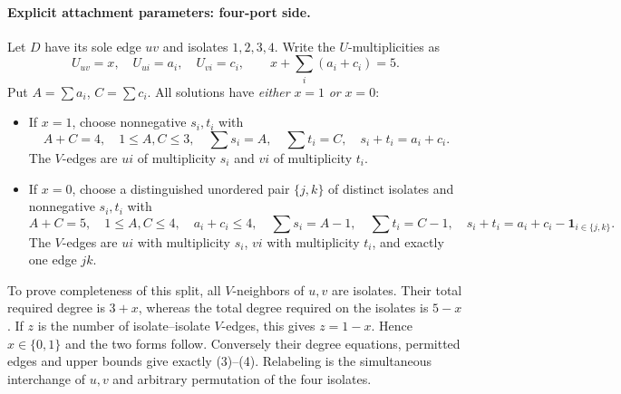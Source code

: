 \documentclass[11pt]{article}
\begin{document}
\paragraph{Explicit attachment parameters: four-port side.}
Let $D$ have its sole edge $uv$ and isolates $1,2,3,4$.
Write the $U$-multiplicities as
\[
 U_{uv}=x,\quad U_{u i}=a_i,\quad U_{v i}=c_i,
 \qquad x+\sum_i(a_i+c_i)=5.                        \tag{10}
\]
Put $A=\sum a_i$, $C=\sum c_i$.
All solutions have \emph{either} $x=1$ \emph{or} $x=0$:
\begin{itemize}
\item If $x=1$, choose nonnegative $s_i,t_i$ with
\[
 A+C=4,\quad1\leq A,C\leq3,\quad
 \sum s_i=A,\quad\sum t_i=C,\quad
 s_i+t_i=a_i+c_i.                                 \tag{11}
\]
The $V$-edges are $u i$ of multiplicity $s_i$ and $v i$ of
multiplicity $t_i$.
\item If $x=0$, choose a distinguished unordered pair $\{j,k\}$
of distinct isolates and nonnegative $s_i,t_i$ with
\[
 A+C=5,\quad1\leq A,C\leq4,\quad a_i+c_i\leq4,
 \quad\sum s_i=A-1,\quad\sum t_i=C-1,
 \quad s_i+t_i=a_i+c_i-\mathbf1_{i\in\{j,k\}}.      \tag{12}
\]
The $V$-edges are $u i$ with multiplicity $s_i$, $v i$ with
multiplicity $t_i$, and exactly one edge $jk$.
\end{itemize}
To prove completeness of this split, all $V$-neighbors of $u,v$
are isolates. Their total required degree is $3+x$, whereas the
total degree required on the isolates is $5-x$. If $z$ is the
number of isolate--isolate $V$-edges, this gives $z=1-x$.
Hence $x\in\{0,1\}$ and the two forms follow. Conversely their
degree equations, permitted edges and upper bounds give exactly
(3)--(4). Relabeling is the simultaneous interchange of $u,v$
and arbitrary permutation of the four isolates.
\end{document}
